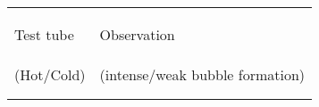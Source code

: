 \documentclass[main.tex]{subfiles}
\begin{document}
\begin{center}\begin{tabular}{ |p{4cm}|p{8cm}|  }
\hline
      \begin{center}Test tube \end{center} &   \begin{center}Observation \end{center}         \\
         {\small(Hot/Cold)} &     {\small(intense/weak bubble formation) }        \\
\hline
   \vspace{0cm}\vspace{.25cm} &               \\\hline
   \vspace{0cm}\vspace{.25cm} &             \\\hline
   

\end{tabular}\end{center}




\newpage
 
\end{document}

